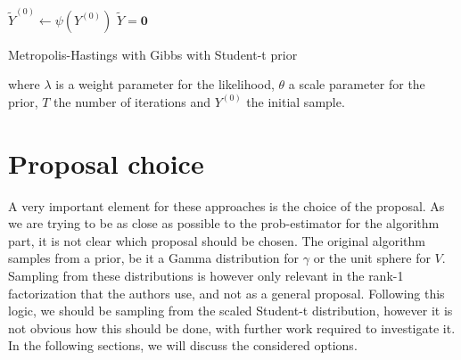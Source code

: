 \documentclass[12pt]{memoir}
\newcommand{\mb}{\mathbf}
\begin{document}
\begin{algorithm}[H]
    \DontPrintSemicolon

    $\tilde Y^{(0)} \gets \psi(Y^{(0)})$\;
    $\tilde Y = \mb 0$\;
    \caption{Metropolis-Hastings with Gibbs with Student-t prior}
\end{algorithm}\medbreak
where $\lambda$ is a weight parameter for the likelihood, $\theta$ a scale parameter for the prior, $T$ the number of iterations and $Y^{(0)}$ the initial sample.\medbreak

\section{Proposal choice}\label{section:proposal-choice}
A very important element for these approaches is the choice of the proposal. As we are trying to be as close as possible to the prob-estimator for the algorithm part, it is not clear which proposal should be chosen. The original algorithm samples from a prior, be it a Gamma distribution for $\gamma$ or the unit sphere for $V$. Sampling from these distributions is however only relevant in the rank-1 factorization that the authors use, and not as a general proposal. Following this logic, we should be sampling from the scaled Student-t distribution, however it is not obvious how this should be done, with further work required to investigate it. In the following sections, we will discuss the considered options.
\end{document}
